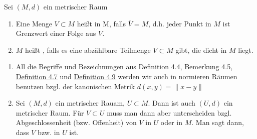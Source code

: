 \begin{definition} \label{def:1-4.9}
	Sei $(M, d)$ ein metrischer Raum
	\begin{enumerate}[label=\alph*\upshape)]
		\item Eine Menge $V \subset M$ hei{\ss}t  in M, falls $\bar V = M$, d.h. jeder Punkt in $M$ ist Grenzwert einer Folge aus $V$.
		\item $M$ hei{\ss}t , falls es eine abzählbare Teilmenge $V \subset M$ gibt, die dicht in $M$ liegt.
	\end{enumerate}
\end{definition}

\begin{bemerkung}
	\begin{enumerate}[label=\alph*\upshape)]
		\item All die Begriffe und Bezeichnungen aus \hyperref[def:1-4.4-abgoff]{Definition 4.4}, \hyperref[bem:1-4.5]{Bemerkung 4.5}, \hyperref[def:1-4.7-abschinnrand]{Definition 4.7} und \hyperref[def:1-4.9]{Definition 4.9} werden wir auch in normieren Räumen benutzen bzgl. der kanonischen Metrik $d(x, y) = \| x - y\|$
		\item Sei $(M, d)$ ein metrischer Rauam, $U \subset M$. Dann ist auch $(U, d)$ ein metrischer Raum. Für $V \subset U$ muss man dann aber unterscheiden bzgl. Abgeschlossenheit (bzw. Offenheit) von $V$ in $U$ oder in $M$. Man sagt dann, dass $V$  bzw.  in $U$ ist.
	\end{enumerate}	
\end{bemerkung}

